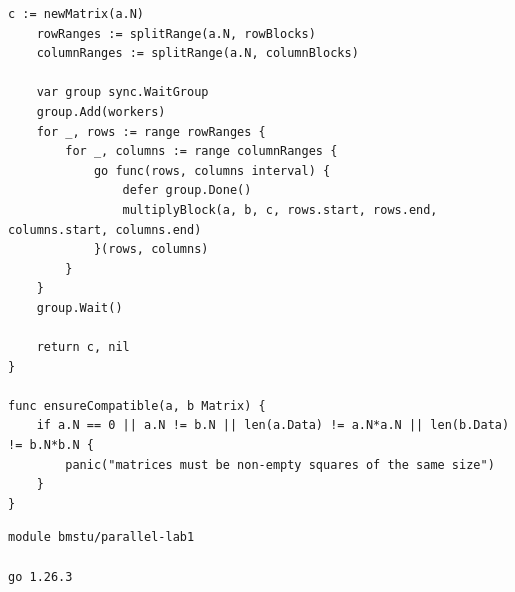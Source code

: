 \documentclass[a4paper,14pt]{extarticle}
\begin{document}
\begin{lstlisting}[caption={Файл 	exttt{multiply.go}}]
    c := newMatrix(a.N)
    rowRanges := splitRange(a.N, rowBlocks)
    columnRanges := splitRange(a.N, columnBlocks)

    var group sync.WaitGroup
    group.Add(workers)
    for _, rows := range rowRanges {
        for _, columns := range columnRanges {
            go func(rows, columns interval) {
                defer group.Done()
                multiplyBlock(a, b, c, rows.start, rows.end, columns.start, columns.end)
            }(rows, columns)
        }
    }
    group.Wait()

    return c, nil
}

func ensureCompatible(a, b Matrix) {
    if a.N == 0 || a.N != b.N || len(a.Data) != a.N*a.N || len(b.Data) != b.N*b.N {
        panic("matrices must be non-empty squares of the same size")
    }
}
\end{lstlisting}

\begin{lstlisting}[language={},caption={Файл 	exttt{go.mod}}]
module bmstu/parallel-lab1

go 1.26.3
\end{lstlisting}
\end{document}

